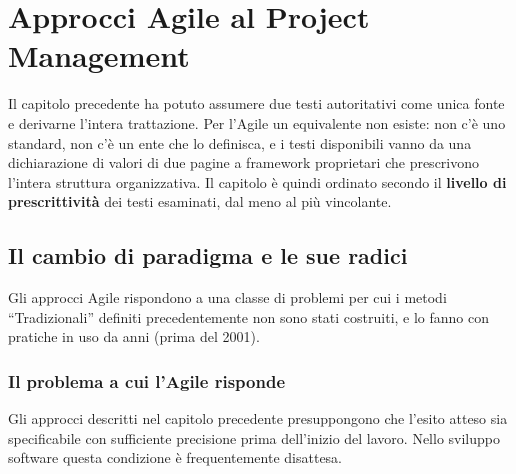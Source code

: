 %

\chapter{Approcci Agile al Project Management}
\label{cap:agile}

Il capitolo precedente ha potuto assumere due testi autoritativi come unica
fonte e derivarne l'intera trattazione. Per l'Agile un equivalente non esiste:
non c'\`e uno standard, non c'\`e un ente che lo definisca, e i testi
disponibili vanno da una dichiarazione di valori di due pagine a framework
proprietari che prescrivono l'intera struttura organizzativa. Il capitolo \`e
quindi ordinato secondo il \textbf{livello di prescrittivit\`a} dei testi
esaminati, dal meno al pi\`u vincolante.


\section{Il cambio di paradigma e le sue radici}

Gli approcci Agile rispondono a una classe di problemi per cui i metodi
``Tradizionali'' definiti precedentemente non sono stati costruiti, e lo fanno con
pratiche in uso da anni (prima del 2001).

\subsection{Il problema a cui l'Agile risponde}

Gli approcci descritti nel capitolo precedente presuppongono che l'esito atteso
sia specificabile con sufficiente precisione prima dell'inizio del lavoro. Nello
sviluppo software questa condizione \`e frequentemente disattesa.

